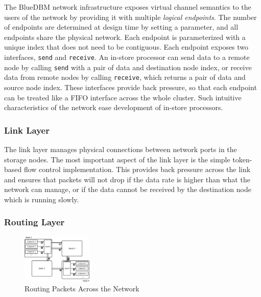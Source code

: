The BlueDBM network infrastructure exposes virtual channel semantics to the
users of the network by providing it with multiple \emph{logical endpoints}.  The
number of endpoints are determined at design time by setting a parameter, and
all endpoints share the physical network.  Each endpoint is parameterized with a
unique index that does not need to be contiguous.  Each endpoint exposes two
interfaces, \texttt{send} and \texttt{receive}. An in-store processor can send
data to a remote node by calling \texttt{send} with a pair of data and
destination node index, or receive data from remote nodes by calling
\texttt{receive}, which returns a pair of data and source node index. These
interfaces provide back pressure, so that each endpoint can be treated like a
FIFO interface across the whole cluster. Such intuitive characteristics of the
network ease development of in-store processors.

\subsubsection{Link Layer}

The link layer manages physical connections between network ports in the storage
nodes. The most important aspect of the link layer is the simple token-based
flow control implementation. This provides back pressure across the link and
ensures that packets will not drop if the data rate is higher than what the
network can manage, or if the data cannot be received by the destination node which is running slowly.

\subsubsection{Routing Layer}


\begin{figure}[h]
	\begin{center}
	\includegraphics[width=0.30\textwidth]{figures/routing-crop.pdf}
	\caption{Routing Packets Across the Network}
	\label{fig:networkrouting}
	\end{center}
\end{figure}

